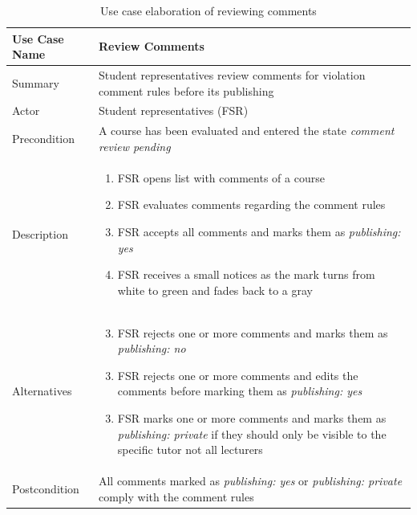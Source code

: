 \begin{table}[]
    \centering
    \label{tab:use-case}
    \begin{tabularx}{\textwidth}{|l|X|}
        \hline
        Use Case Name                      
            & Review Comments       \\ \hline 
        Summary                           
            & Student representatives review comments for violation comment rules before its publishing                \\ \hline
        Actor 
            & Student representatives (FSR)         \\ \hline
        Precondition          
            & A course has been evaluated and entered the state \emph{comment review pending} \\ \hline
        Description               
            & 	\begin{enumerate}
                    \item FSR opens list with comments of a course
                    \item FSR evaluates comments regarding the comment rules
                    \item FSR accepts all comments and marks them as \emph{publishing: yes}
                    \item FSR receives a small notices as the mark turns from white to green and fades back to a gray
                \end{enumerate}          \\ \hline
        Alternatives                 
            & 	\begin{enumerate}
                    \setcounter{enumi}{2}
                    \item FSR rejects one or more comments and marks them as \emph{publishing: no}
                \end{enumerate}
                \begin{enumerate}
                    \setcounter{enumi}{2}
                    \item FSR rejects one or more comments  and edits the comments before marking them as \emph{publishing: yes}
                \end{enumerate}
                \begin{enumerate}
                    \setcounter{enumi}{2}
                    \item FSR marks one or more comments and marks them as \emph{publishing: private} if they should only be visible to the specific tutor not all lecturers
                \end{enumerate}     \\ \hline
        Postcondition        
            & All comments marked as \emph{publishing: yes} or \emph{publishing: private} comply with the comment rules         \\ \hline
    \end{tabularx}
    \caption{Use case elaboration of reviewing comments}
\end{table}

